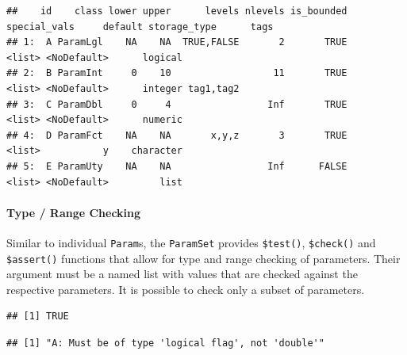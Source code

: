 \documentclass[]{scrbook}
\newenvironment{Shaded}{\begin{snugshade}}{\end{snugshade}}
\newcommand{\DataTypeTok}[1]{\textcolor[rgb]{0.13,0.29,0.53}{#1}}
\newcommand{\DecValTok}[1]{\textcolor[rgb]{0.00,0.00,0.81}{#1}}
\newcommand{\KeywordTok}[1]{\textcolor[rgb]{0.13,0.29,0.53}{\textbf{#1}}}
\newcommand{\NormalTok}[1]{#1}
\newcommand{\OperatorTok}[1]{\textcolor[rgb]{0.81,0.36,0.00}{\textbf{#1}}}
\newcommand{\OtherTok}[1]{\textcolor[rgb]{0.56,0.35,0.01}{#1}}
\let\oldparagraph\paragraph
\renewcommand{\paragraph}[1]{\oldparagraph{#1}\mbox{}}
\renewenvironment{Shaded} {\begin{snugshade}\small} {\end{snugshade}}
\begin{document}
\begin{verbatim}
##    id    class lower upper      levels nlevels is_bounded special_vals     default storage_type      tags
## 1:  A ParamLgl    NA    NA  TRUE,FALSE       2       TRUE       <list> <NoDefault>      logical          
## 2:  B ParamInt     0    10                  11       TRUE       <list> <NoDefault>      integer tag1,tag2
## 3:  C ParamDbl     0     4                 Inf       TRUE       <list> <NoDefault>      numeric          
## 4:  D ParamFct    NA    NA       x,y,z       3       TRUE       <list>           y    character          
## 5:  E ParamUty    NA    NA                 Inf      FALSE       <list> <NoDefault>         list
\end{verbatim}

\hypertarget{type-range-checking-1}{%
\paragraph{Type / Range Checking}\label{type-range-checking-1}}

Similar to individual \texttt{Param}s, the \texttt{ParamSet} provides \texttt{\$test()}, \texttt{\$check()} and \texttt{\$assert()} functions that allow for type and range checking of parameters.
Their argument must be a named list with values that are checked against the respective parameters.
It is possible to check only a subset of parameters.

\begin{Shaded}
\end{Shaded}

\begin{verbatim}
## [1] TRUE
\end{verbatim}

\begin{Shaded}
\end{Shaded}

\begin{verbatim}
## [1] "A: Must be of type 'logical flag', not 'double'"
\end{verbatim}
\end{document}
